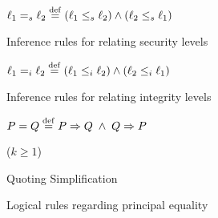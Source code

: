 \begin{figure}
  \centering

  $\ell_1 =_s \ell_2 \stackrel{\mathrm{def}}{=} (\ell_1 \leq_s \ell_2) \wedge (\ell_2 \leq_s
  \ell_1)$ \vspace*{2em} 
  
   \vspace*{2em} 


  \caption{Inference rules for relating security levels}
  \label{fig:summary-security-level-rules}
\end{figure}



\begin{figure}
  \centering

  $\ell_1 =_i \ell_2 \stackrel{\mathrm{def}}{=} (\ell_1 \leq_i \ell_2) \wedge (\ell_2 \leq_i
  \ell_1)$ \vspace*{2em} 
  
   \vspace*{2em} 


  \caption{Inference rules for relating integrity levels}
  \label{fig:summary-integrity-level-rules}
\end{figure}

\begin{figure}[t]
  \centering
   $P = Q \stackrel{\mathrm{def}}{=}  P \Rightarrow Q \;\wedge\;Q \Rightarrow P$
  
    {}{}


  ($k\geq 1$)

      {Quoting Simplification} 
  \caption{Logical rules regarding principal equality}
  \label{fig:summary-principal-equality-rules}
\end{figure}


